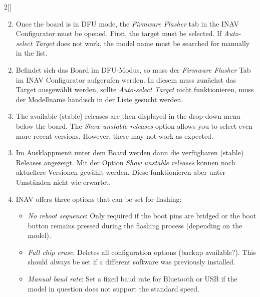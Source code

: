 \begin{paracol}{2}[]
\coleng

	
\begin{enumerate}
\setcounter{enumi}{1}
	\item Once the board is in DFU mode, the \textsl{Firmware Flasher} tab in the INAV Configurator must be opened. First, the target must be selected. If  \textsl{Auto-select Target} does not work, the model name must be searched for manually in the list.
\end{enumerate}

\colger

	
\begin{enumerate}
\setcounter{enumi}{1}
	\item Befindet sich das Board im DFU-Modus, so muss der \textsl{Firmware Flasher} Tab im INAV Configurator aufgerufen werden. In diesem muss zunächst das Target ausgewählt werden, sollte  \textsl{Auto-select Target} nicht funktionieren, muss der Modellname händisch in der Liste gesucht werden.
\end{enumerate}

\coleng


\begin{enumerate}
\setcounter{enumi}{2}
	\item The available (stable) releases are then displayed in the drop-down menu below the board. The \textsl{Show unstable releases} option allows you to select even more recent versions. However, these may not work as expected.
\end{enumerate}

\colger

	
\begin{enumerate}
\setcounter{enumi}{2}
	\item Im Ausklappmenü unter dem Board werden dann die verfügbaren (stable) Releases angezeigt. Mit der Option \textsl{Show unstable releases} können noch aktuellere Versionen gewählt werden. Diese funktionieren aber unter Umständen nicht wie erwartet.
\end{enumerate}

\coleng


\begin{enumerate}
\setcounter{enumi}{3}
	\item INAV offers three options that can be set for flashing:
	\begin{itemize}
		\item \textsl{No reboot sequence}: Only required if the boot pins are bridged or the boot button remains pressed during the flashing process (depending on the model).
		\item \textsl{Full chip erase}: Deletes all configuration options (backup available?). This should always be set if a different software was previously installed.
		\item \textsl{Manual baud rate}: Set a fixed baud rate for Bluetooth or USB if the model in question does not support the standard speed.
	\end{itemize}
\end{enumerate}


\end{paracol}
